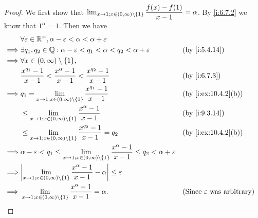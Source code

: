 \begin{proof}
  We first show that \(\lim_{x \to 1 ; x \in (0, \infty) \setminus \left\lbrace1\right\rbrace} \dfrac{f(x) - f(1)}{x - 1} = \alpha\).
  By \cref{i:6.7.2} we know that \(1^{\alpha} = 1\).
  Then we have
  \begin{align*}
             & \forall \varepsilon \in \R^+, \alpha - \varepsilon < \alpha < \alpha + \varepsilon                                                                                                                   \\
    \implies & \exists q_1, q_2 \in \Q : \alpha - \varepsilon < q_1 < \alpha < q_2 < \alpha + \varepsilon                                                         &  & \by{i:5.4.14}                                \\
    \implies & \forall x \in (0, \infty) \setminus \set{1},                                                                                                                                                         \\
             & \dfrac{x^{q_1} - 1}{x - 1} < \dfrac{x^{\alpha} - 1}{x - 1} < \dfrac{x^{q_2} - 1}{x - 1}                                                            &  & \by{i:6.7.3}                                 \\
    \implies & q_1 = \lim_{x \to 1 ; x \in (0, \infty) \setminus \set{1}} \dfrac{x^{q_1} - 1}{x - 1}                                                              &  & \by{i:ex:10.4.2}[b]                          \\
             & \leq \lim_{x \to 1 ; x \in (0, \infty) \setminus \set{1}} \dfrac{x^{\alpha} - 1}{x - 1}                                                            &  & \by{i:9.3.14}                                \\
             & \leq \lim_{x \to 1 ; x \in (0, \infty) \setminus \set{1}} \dfrac{x^{q_2} - 1}{x - 1} = q_2                                                         &  & \by{i:ex:10.4.2}[b]                          \\
    \implies & \alpha - \varepsilon < q_1 \leq \lim_{x \to 1 ; x \in (0, \infty) \setminus \set{1}} \dfrac{x^{\alpha} - 1}{x - 1} \leq q_2 < \alpha + \varepsilon                                                   \\
    \implies & \abs{\lim_{x \to 1 ; x \in (0, \infty) \setminus \set{1}} \dfrac{x^{\alpha} - 1}{x - 1} - \alpha} \leq \varepsilon                                                                                   \\
    \implies & \lim_{x \to 1 ; x \in (0, \infty) \setminus \set{1}} \dfrac{x^{\alpha} - 1}{x - 1} = \alpha.                                                       &  & \text{(Since \(\varepsilon\) was arbitrary)}
  \end{align*}


\end{proof}
